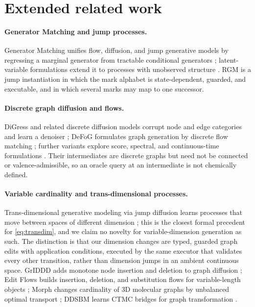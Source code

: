 \documentclass{article}
\newcommand{\rgm}{\textsc{RGM}\xspace}
\theoremstyle{definition}
\theoremstyle{remark}
\begin{document}
\section{Extended related work}\label{app:related}

\paragraph{Generator Matching and jump processes.}
Generator Matching unifies flow, diffusion, and jump generative models by regressing a marginal generator from tractable conditional generators \citep{holderrieth2025generator}; latent-variable formulations extend it to processes with unobserved structure \citep{billera2026latent}. \rgm is a jump instantiation in which the mark alphabet is state-dependent, guarded, and executable, and in which several marks may map to one successor.

\paragraph{Discrete graph diffusion and flows.}
DiGress and related discrete diffusion models corrupt node and edge categories and learn a denoiser \citep{vignac2023digress,austin2021d3pm,campbell2022ctdd}; DeFoG formulates graph generation by discrete flow matching \citep{qin2025defog}; further variants explore score, spectral, and continuous-time formulations \citep{jo2022gdss,jo2023grum,xu2024disco,siraudin2024cometh}. Their intermediates are discrete graphs but need not be connected or valence-admissible, so an oracle query at an intermediate is not chemically defined.

\paragraph{Variable cardinality and trans-dimensional processes.}
Trans-dimensional generative modeling via jump diffusion learns processes that move between spaces of different dimension \citep{campbell2023jump}; this is the closest formal precedent for \eqref{eq:transdim}, and we claim no novelty for variable-dimension generation as such. The distinction is that our dimension changes are typed, guarded graph edits with application conditions, executed by the same executor that validates every other transition, rather than dimension jumps in an ambient continuous space. GrIDDD adds monotone node insertion and deletion to graph diffusion \citep{ninniri2025griddd}; Edit Flows builds insertion, deletion, and substitution flows for variable-length objects \citep{havasi2025editflows}; Morph changes cardinality of 3D molecular graphs by unbalanced optimal transport \citep{franke2026morph}; DDSBM learns CTMC bridges for graph transformation \citep{kim2025ddsbm}.
\end{document}
